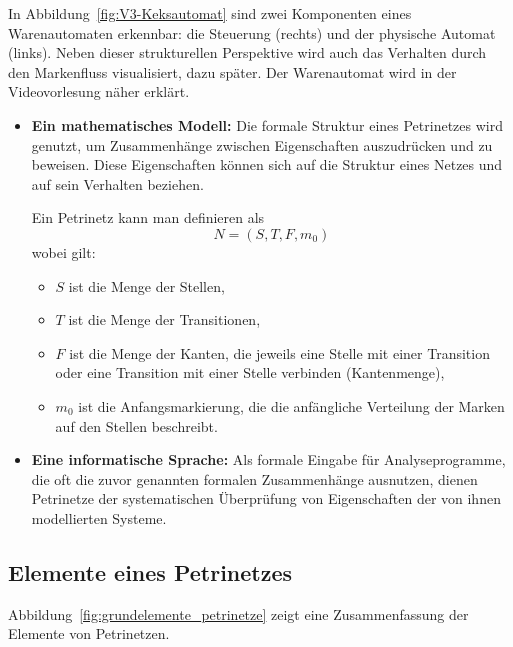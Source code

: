 In Abbildung~\ref{fig:V3-Keksautomat} sind zwei Komponenten eines Warenautomaten erkennbar: die Steuerung (rechts) und der physische Automat (links). Neben dieser strukturellen Perspektive wird auch das Verhalten durch den Markenfluss visualisiert, dazu später. Der Warenautomat wird in der Videovorlesung näher erklärt.

\begin{itemize}
	\item \textbf{Ein mathematisches Modell:} Die formale Struktur eines Petrinetzes wird genutzt, um Zusammenhänge zwischen Eigenschaften auszudrücken und zu beweisen. Diese Eigenschaften können sich auf die Struktur eines Netzes und auf sein Verhalten beziehen.	
	
	Ein Petrinetz kann man definieren als $$N = (S, T, F, m_{0})$$ wobei gilt:
	\begin{itemize}
		\item $S$ ist die Menge der Stellen,
		
		\item $T$ ist die Menge der Transitionen,
		
		\item $F$ ist die Menge der Kanten, die jeweils eine Stelle mit einer Transition oder eine Transition mit einer Stelle verbinden (Kantenmenge),
		
		\item $m_{0}$ ist die Anfangsmarkierung, die die anfängliche Verteilung der Marken auf den Stellen beschreibt.
	\end{itemize}
	
	\item \textbf{Eine informatische Sprache:} Als formale Eingabe für Analyseprogramme, die oft die zuvor genannten formalen Zusammenhänge ausnutzen, dienen Petri\-netze der systematischen Überprüfung von Eigenschaften der von ihnen model\-lierten Systeme.
\end{itemize}


\subsection*{Elemente eines Petrinetzes}

Abbildung~\ref{fig:grundelemente_petrinetze} zeigt eine Zusammenfassung der Elemente von Petrinetzen.

